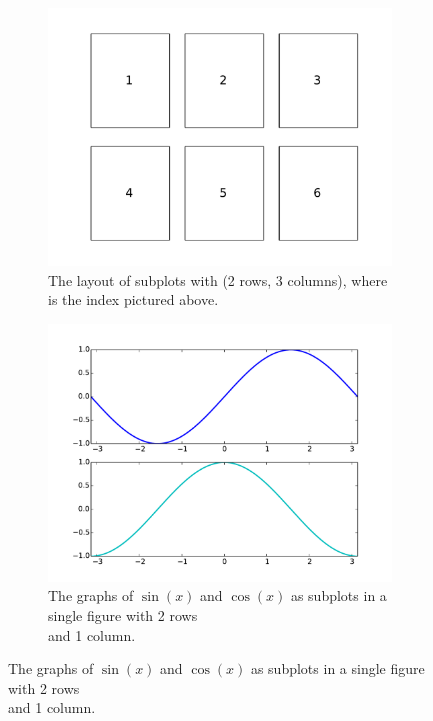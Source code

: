 \begin{figure}[H] %
\captionsetup[subfigure]{justification=centering}
\centering
\begin{subfigure}{.49\textwidth}
    \centering
    \includegraphics[width=\linewidth]{layout.pdf}
    \caption{The layout of subplots with  (2 rows, 3 columns), where  is the index pictured above.}
    \label{fig:layout}
\end{subfigure}
%
\begin{subfigure}{.49\textwidth}
    \centering
    \includegraphics[width=\linewidth]{subplots.pdf}
    \caption{The graphs of $\sin(x)$ and $\cos(x)$ as subplots in a single figure with 2 rows\\and 1 column.}
    \label{fig:sincossubplots}
\end{subfigure}
\label{fig:subplots}
\end{figure}

